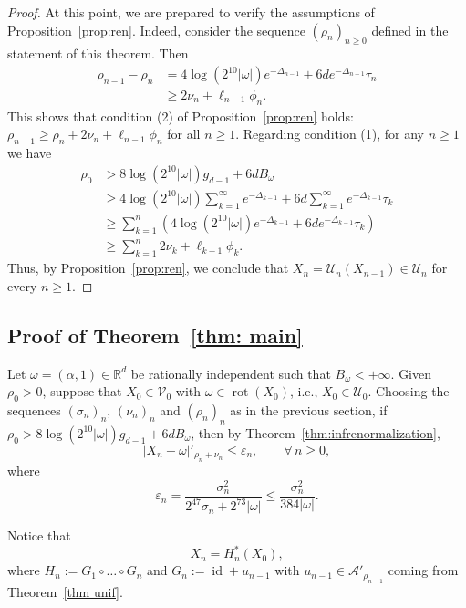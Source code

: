 \documentclass[12pt,reqno,a4paper]{amsart}%
\numberwithin{equation}{section}
\newcommand{\Vs}{{\mathscr{V}}}
\newcommand{\Us}{{\mathscr{U}}}
\newcommand{\A}{{\mathcal A}}
\newcommand{\UU}{{\mathcal U}}
\newcommand{\Rr}{{\mathbb{R}}}
\newcommand{\id}  {\operatorname{id}}
\newcommand{\rot}{\operatorname{rot}}
\def\vecalf{{\text{$\alpha$}}}
\def\vecomega{{\text{$\omega$}}}
\begin{document}
\begin{proof}
At this point, we are prepared to verify the assumptions of Proposition~\ref{prop:ren}.  Indeed, consider the sequence $(\rho_n)_{n\geq0}$ defined in the statement of this theorem. Then
\begin{align*}
\rho_{n-1} -\rho_n &= 4\log (2^{10}|\omega|)e^{-\Delta_{n-1}} + 6d e^{-\Delta_{n-1}}\tau_n\\
&\geq 2\nu_n+\ell_{n-1}\phi_n.
\end{align*}
This shows that condition (2) of Proposition~\ref{prop:ren} holds:  $\rho_{n-1}\geq \rho_n +2\nu_{n}+\ell_{n-1}\phi_n$ for all $n\geq1$.  Regarding condition (1),  for any $n\geq1$ we have
\begin{align*}
\rho_0& > 8\log(2^{10}|\omega|)g_{d-1}+ 6d B_\omega\\
&\geq 4\log(2^{10}|\omega|)\sum_{k=1}^\infty e^{-\Delta_{k-1}}+6d\sum_{k=1}^\infty e^{-\Delta_{k-1}}\tau_k\\
&\geq \sum_{k=1}^n \left(4\log(2^{10}|\omega|)e^{-\Delta_{k-1}}+6de^{-\Delta_{k-1}}\tau_k\right)\\
&\geq \sum_{k=1}^n2\nu_k+\ell_{k-1}\phi_k.
\end{align*}
Thus,  by Proposition~\ref{prop:ren}, we conclude that $X_n=\UU_n(X_{n-1})\in \Us_n$ for every $n\geq1$.
\end{proof}

\subsection{Proof of Theorem~\ref{thm: main}}
Let $\vecomega=(\vecalf,1)\in\Rr^d$ be rationally independent such that $B_\omega<+\infty$. Given $\rho_0>0$, suppose that $X_0\in\Vs_0$ with $\omega\in \rot(X_0)$, i.e., $X_0\in\Us_0$. Choosing the sequences $(\sigma_n)_n$, $(\nu_n)_n$ and $(\rho_n)_n$ as in the previous section, if $\rho_0 > 8\log(2^{10}|\omega|)g_{d-1}+ 6d B_\omega$, then by Theorem~\ref{thm:infrenormalization}, 
$$
|X_n-\omega|'_{\rho_n+\nu_n}\leq\varepsilon_n,
\qquad
\forall\,n\geq0,
$$  
where
\begin{equation}\label{eq:epsilon n}
\varepsilon_n=\frac{\sigma_{n}^2}{2^47\sigma_{n} + 2^73|\omega|}\leq \frac{\sigma_{n}^2}{384|\omega|}.
\end{equation}

Notice that
\begin{equation}
X_n=H_n^*(X_0),
\end{equation}
where $H_n := G_1\circ\dots\circ G_n$ and $G_n := \id + u_{n-1}$ with $u_{n-1}\in \A'_{\rho_{n-1}}$ coming from Theorem~\ref{thm unif}.  
\end{document}
